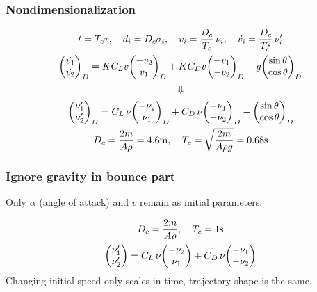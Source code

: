 \documentclass{beamer}
\begin{document}

\begin{frame}

\frametitle{Nondimensionalization}

\begin{gather}
t = T_c \tau,  \quad d_i = D_c \sigma_i, \quad v_i = \dfrac{D_c}{T_c} \, \nu_i, \quad
\dot{v_i} = \dfrac{D_c}{T_c^2} \, \nu_i'
\\
\mqty( \dot{v_1} \\ \dot{v_2}\\)_D = K  C_L v \mqty(-v_2 \\ v_1\\)_D + K C_D v \mqty(-v_1 \\ -v_2\\)_D - g  \mqty(\sin \theta \\ \cos \theta)_D
\end{gather}
$$\Downarrow$$
\begin{gather}
\mqty( \nu_1' \\ \nu_2' \\)_D = C_L  \, \nu \mqty(-\nu_2 \\ \nu_1\\)_D + C_D \, \nu \mqty(-\nu_1 \\ -\nu_2\\)_D -   \mqty(\sin \theta \\ \cos \theta)_D
\\
D_c = \dfrac{2m}{A \rho} = 4.6 \mathrm{m}, \quad T_c = \sqrt{\dfrac{2m}{A \rho g}} = 0.68 \mathrm{s}
\end{gather}

\end{frame}


\begin{frame}

\frametitle{Ignore gravity in bounce part}
Only $\alpha$ (angle of attack) and $v$ remain as initial parameters.

\begin{gather}
D_c = \dfrac{2m}{A \rho}, \quad T_c = 1 \mathrm{s}
\\
\mqty( \nu_1' \\ \nu_2' \\) = C_L  \, \nu \mqty(-\nu_2 \\ \nu_1\\) + C_D \, \nu \mqty(-\nu_1 \\ -\nu_2\\)
\end{gather}
Changing initial speed only scales in time, trajectory shape is the same.


\end{frame}
\end{document}
